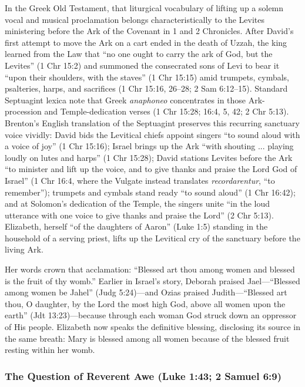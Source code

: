 In the Greek Old Testament, that liturgical vocabulary of lifting up a solemn vocal and musical proclamation belongs characteristically to the Levites ministering before the Ark of the Covenant in 1 and 2 Chronicles. After David's first attempt to move the Ark on a cart ended in the death of Uzzah, the king learned from the Law that ``no one ought to carry the ark of God, but the Levites'' (1 Chr 15:2) and summoned the consecrated sons of Levi to bear it ``upon their shoulders, with the staves'' (1 Chr 15:15) amid trumpets, cymbals, psalteries, harps, and sacrifices (1 Chr 15:16, 26--28; 2 Sam 6:12--15). Standard Septuagint lexica note that Greek \textit{anaphoneo} concentrates in those Ark-procession and Temple-dedication verses (1 Chr 15:28; 16:4, 5, 42; 2 Chr 5:13). Brenton's English translation of the Septuagint preserves this recurring sanctuary voice vividly: David bids the Levitical chiefs appoint singers ``to sound aloud with a voice of joy'' (1 Chr 15:16); Israel brings up the Ark ``with shouting ... playing loudly on lutes and harps'' (1 Chr 15:28); David stations Levites before the Ark ``to minister and lift up the voice, and to give thanks and praise the Lord God of Israel'' (1 Chr 16:4, where the Vulgate instead translates \textit{recordarentur}, ``to remember''); trumpets and cymbals stand ready ``to sound aloud'' (1 Chr 16:42); and at Solomon's dedication of the Temple, the singers unite ``in the loud utterance with one voice to give thanks and praise the Lord'' (2 Chr 5:13). Elizabeth, herself ``of the daughters of Aaron'' (Luke 1:5) standing in the household of a serving priest, lifts up the Levitical cry of the sanctuary before the living Ark.

Her words crown that acclamation: ``Blessed art thou among women and blessed is the fruit of thy womb.'' Earlier in Israel's story, Deborah praised Jael---``Blessed among women be Jahel'' (Judg 5:24)---and Ozias praised Judith---``Blessed art thou, O daughter, by the Lord the most high God, above all women upon the earth'' (Jdt 13:23)---because through each woman God struck down an oppressor of His people. Elizabeth now speaks the definitive blessing, disclosing its source in the same breath: Mary is blessed among all women because of the blessed fruit resting within her womb.

\subsubsection{The Question of Reverent Awe (Luke 1:43; 2 Samuel 6:9)}

